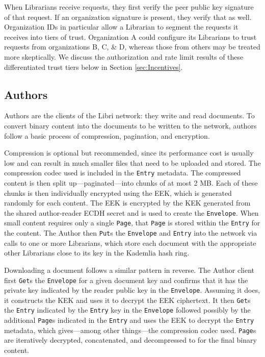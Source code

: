 \documentclass[10pt]{article}
\newcommand{\ttt}[1]{\texttt{#1}}
\def\Entry{\ttt{Entry}}
\def\Page{\ttt{Page}}
\def\Envelope{\ttt{Envelope}}
\begin{document}
When Librarians receive requests, they first verify the peer public key signature of that request. If an organization signature is present, they verify that as well. Organization IDs in particular allow a Librarian to segment the requests it receives into tiers of trust. Organization A could configure its Librarians to trust requests from organizations B, C, \& D, whereas those from others may be treated more skeptically. We discuss the authorization and rate limit results of these differentiated trust tiers below in Section \ref{sec:Incentives}.

\subsection{Authors}
\label{sec:Authors}
Authors are the clients of the Libri network: they write and read documents. To convert binary content into the documents to be written to the network, authors follow a basic process of compression, pagination, and encryption. 

Compression is optional but recommended, since its performance cost is usually low and can result in much smaller files that need to be uploaded and stored. The compression codec used is included in the \Entry{} metadata. The compressed content is then split up---paginated---into chunks of at most 2 MB. Each of these chunks is then individually encrypted using the EEK, which is generated randomly for each content. The EEK is encrypted by the KEK generated from the shared author-reader ECDH secret and is used to create the \Envelope{}. When small content requires only a single \Page{}, that \Page{} is stored within the \Entry{} for the content. The Author then \ttt{Put}s the \Envelope{} and \Entry{} into the network via calls to one or more Librarians, which store each document with the appropriate other Librarians close to its key in the Kademlia hash ring. 

Downloading a document follows a similar pattern in reverse. The Author client first \ttt{Get}s the \Envelope{} for a given document key and confirms that it has the private key indicated by the reader public key in the \Envelope{}. Assuming it does, it constructs the KEK and uses it to decrypt the EEK ciphertext. It then \texttt{Get}s the \Entry{} indicated by the \Entry{} key in the \Envelope{} followed possibly by the additional \Page{}s indicated in the \Entry{} and uses the EEK to decrypt the \Entry{} metadata, which gives---among other things---the compression codec used. \Page{}s are iteratively decrypted, concatenated, and decompressed to for the final binary content. 
\end{document}
